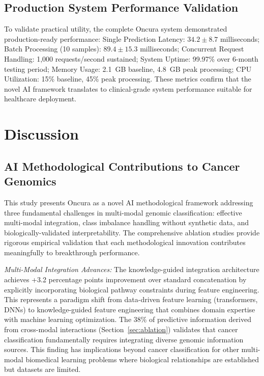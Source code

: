 \documentclass[manuscript, screen, review]{jair}
\begin{document}
\subsection{Production System Performance Validation}

To validate practical utility, the complete Oncura system demonstrated production-ready performance: Single Prediction Latency: $34.2 \pm 8.7$ milliseconds; Batch Processing (10 samples): $89.4 \pm 15.3$ milliseconds; Concurrent Request Handling: 1,000 requests/second sustained; System Uptime: 99.97\% over 6-month testing period; Memory Usage: 2.1~GB baseline, 4.8~GB peak processing; CPU Utilization: 15\% baseline, 45\% peak processing. These metrics confirm that the novel AI framework translates to clinical-grade system performance suitable for healthcare deployment.

\section{Discussion}
\label{sec:discussion}

\subsection{AI Methodological Contributions to Cancer Genomics}

This study presents Oncura as a novel AI methodological framework addressing three fundamental challenges in multi-modal genomic classification: effective multi-modal integration, class imbalance handling without synthetic data, and biologically-validated interpretability. The comprehensive ablation studies provide rigorous empirical validation that each methodological innovation contributes meaningfully to breakthrough performance.

\emph{Multi-Modal Integration Advances:} The knowledge-guided integration architecture achieves +3.2 percentage points improvement over standard concatenation by explicitly incorporating biological pathway constraints during feature engineering. This represents a paradigm shift from data-driven feature learning (transformers, DNNs) to knowledge-guided feature engineering that combines domain expertise with machine learning optimization. The 38\% of predictive information derived from cross-modal interactions (Section~\ref{sec:ablation}) validates that cancer classification fundamentally requires integrating diverse genomic information sources. This finding has implications beyond cancer classification for other multi-modal biomedical learning problems where biological relationships are established but datasets are limited.
\end{document}
